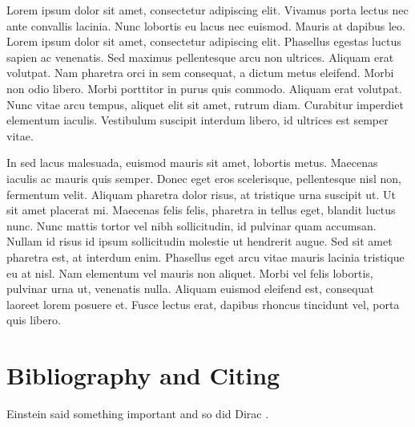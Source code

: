 \documentclass[12pt, a4paper, twopage]{scrartcl}
\begin{document}
\begin{mdframed}[style=exampledefault,frametitle={needs package mdframed.}]
	
	Lorem ipsum dolor sit amet, consectetur adipiscing elit. Vivamus porta lectus nec ante convallis lacinia. Nunc lobortis eu lacus nec euismod. Mauris at dapibus leo. Lorem ipsum dolor sit amet, consectetur adipiscing elit. Phasellus egestas luctus sapien ac venenatis. Sed maximus pellentesque arcu non ultrices. Aliquam erat volutpat. Nam pharetra orci in sem consequat, a dictum metus eleifend. Morbi non odio libero. Morbi porttitor in purus quis commodo. Aliquam erat volutpat. Nunc vitae arcu tempus, aliquet elit sit amet, rutrum diam. Curabitur imperdiet elementum iaculis. Vestibulum suscipit interdum libero, id ultrices est semper vitae.
	
\end{mdframed}


\begin{mdframed}[style=simple,frametitle={My style.}]

	In sed lacus malesuada, euismod mauris sit amet, lobortis metus. Maecenas iaculis ac mauris quis semper. Donec eget eros scelerisque, pellentesque nisl non, fermentum velit. Aliquam pharetra dolor risus, at tristique urna suscipit ut. Ut sit amet placerat mi. Maecenas felis felis, pharetra in tellus eget, blandit luctus nunc. Nunc mattis tortor vel nibh sollicitudin, id pulvinar quam accumsan. Nullam id risus id ipsum sollicitudin molestie ut hendrerit augue. Sed sit amet pharetra est, at interdum enim. Phasellus eget arcu vitae mauris lacinia tristique eu at nisl. Nam elementum vel mauris non aliquet. Morbi vel felis lobortis, pulvinar urna ut, venenatis nulla. Aliquam euismod eleifend est, consequat laoreet lorem posuere et. Fusce lectus erat, dapibus rhoncus tincidunt vel, porta quis libero. 

\end{mdframed}









\section{Bibliography and Citing}


Einstein said something important\cite{einstein} and so did Dirac \cite{dirac}.
\end{document}

